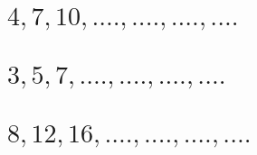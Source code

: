 \documentclass[template=tabling,81pt,headonall]{azmoon}
\begin{document}
\begin{questions}
{\begin{LTR}
\begin{parts}[1]
\part{$4 , 7 , 10 , .... , .... , .... , ....$}
\part{$3 , 5 , 7 , .... , .... , .... , ....$}
\part{$8 , 12 , 16 , .... , .... , .... , ....$}
\end{parts}
\end{LTR}
        
    }\end{questions}
    
\end{document}
